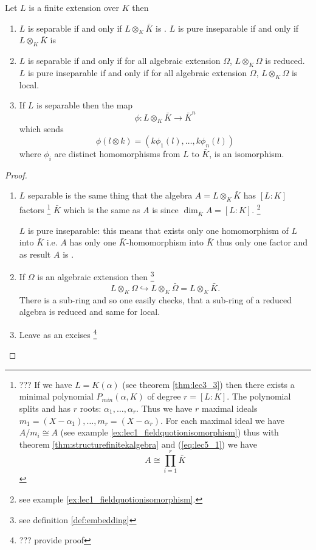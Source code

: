 \begin{theorem}
  Let $L$ is a finite extension over $K$ then
  \begin{enumerate}
  \item $L$ is separable if and only if $L \otimes_K \bar{K}$
    is .
    $L$ is pure inseparable if and only if $L \otimes_K \bar{K}$
    is 
  \item $L$ is separable if and only if for all algebraic extension
    $\Omega$, $L \otimes_K \Omega$ is reduced.
    $L$ is pure inseparable if and only if for all algebraic extension
    $\Omega$, $L \otimes_K \Omega$ is local.
  \item If $L$ is separable then the map
    \[
    \phi: L \otimes_K \bar{K} \to \bar{K}^n
    \]
    which sends
    \[
    \phi\left(l \otimes k\right) =
    \left(
    k \phi_1\left(l\right),
    \dots,
    k \phi_n\left(l\right)
    \right)
    \]
    where $\phi_i$ are distinct homomorphisms from $L$ to $\bar{K}$, 
    is an isomorphism.
  \end{enumerate}
  \begin{proof}
    \begin{enumerate}
    \item $L$ separable is the same thing that the algebra
      $A = L\otimes_K \bar{K}$ has $\left[L:K\right]$ factors
      \footnote{
        ??? If we have $L = K\left(\alpha\right)$
        (see theorem \ref{thm:lec3_3}) then
        there exists a minimal polynomial $P_{min}\left(\alpha,
        K\right)$ of degree $r = \left[L:K\right]$. The polynomial
        splits and has $r$ roots: $\alpha_1, \dots, \alpha_r$. Thus we
        have $r$ maximal ideals
        \(
        m_1 = \left(X - \alpha_1\right), \dots,
        m_r = \left(X - \alpha_r\right)
        \).
        For each maximal ideal we have $A/m_i \cong A$ (see example
        \ref{ex:lec1_fieldquotionisomorphism}) thus with theorem
        \ref{thm:structurefinitekalgebra} and (\ref{eq:lec5_1}) we have
        \[
        A \cong \prod_{i=1}^r \bar{K}
        \]
      }
      $\bar{K}$ which is the same as $A$ is 
      since $\dim_{\bar{K}} A = \left[L:K\right]$.
      \footnote{
        see example \ref{ex:lec1_fieldquotionisomorphism}.
      }

      $L$ is pure inseparable: this means that exists only one
      homomorphism of $L$ into $\bar{K}$ i.e. $A$ has only one
      $\bar{K}$-homomorphism into $\bar{K}$ thus only one factor and
      as result $A$ is .
    \item If $\Omega$ is an algebraic extension then
      \footnote {
        see definition \ref{def:embedding}
      }
      \[
      L \otimes_K \Omega \hookrightarrow L \otimes_K \bar{\Omega} =
      L \otimes_K \bar{K}.
      \]
      There is a sub-ring and so one easily checks, that a sub-ring of
      a reduced algebra is reduced and same for local.  
    \item Leave as an excises
      \footnote{
        ??? provide proof
      }
    \end{enumerate}
  \end{proof}
  \label{thm:lec5_1}
\end{theorem}
